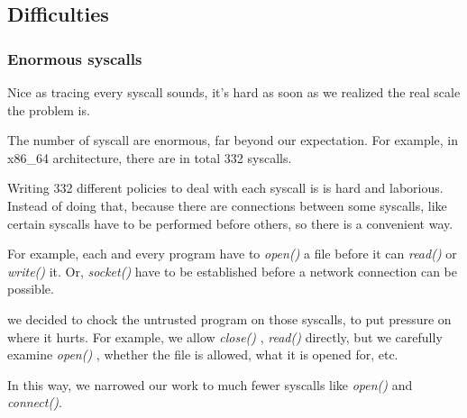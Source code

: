 \documentclass[conference,compsoc]{IEEEtran}
\begin{document}
	\subsection{Difficulties} 
		\subsubsection{Enormous syscalls}
			\par
				Nice as tracing every syscall sounds, it's hard as soon as we realized the real scale the problem is. 
			\par 
				The number of syscall are enormous, far beyond our expectation. 
				For example, in x86\_64 architecture, there are in total 332\cite{LinuxSysCall} syscalls. 
				\par
				Writing 332 different policies to deal with each syscall is is hard and laborious. Instead of doing that, because there are connections between some syscalls, like certain syscalls have to be performed before others, so there is a convenient way.
				\par
				For example, each and every program have to \emph{ open() } a file before it can \emph{read()} or \emph{write()} it. 
				Or, \emph{ socket() } have to be established before a network connection can be possible.
			\par
				we decided to chock the untrusted program on those syscalls, to put pressure on where it hurts. 
				For example, we allow \emph{ close() }, \emph{ read() } directly, but we carefully examine \emph{ open() }, whether the file is allowed, what it is opened for, etc.
			\par 
				In this way, we narrowed our work to much fewer syscalls like \emph{open()} and \emph{connect()}.
\end{document}
